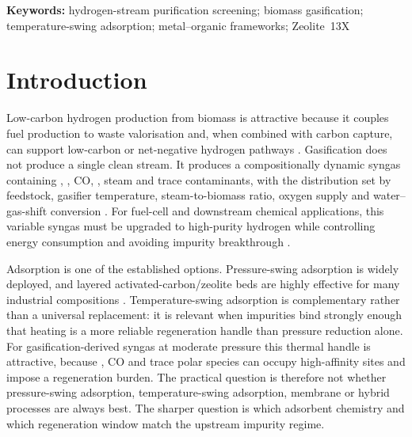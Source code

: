\documentclass[11pt,a4paper]{article}
\newcommand{\Htwo}{\ce{H2}}
\newcommand{\COtwo}{\ce{CO2}}
\newcommand{\CHfour}{\ce{CH4}}
\newcommand{\TSA}{temperature-swing adsorption}
\newcommand{\PSA}{pressure-swing adsorption}
\begin{document}
\noindent\textbf{Keywords:} hydrogen-stream purification screening; biomass gasification; temperature-swing adsorption; metal--organic frameworks; Zeolite~13X

\newpage

\section{Introduction}
\label{sec:intro}

Low-carbon hydrogen production from biomass is attractive because it couples fuel production to waste valorisation and, when combined with carbon capture, can support low-carbon or net-negative hydrogen pathways \citep{Rosa2022BiomassH2BECCS,Florin2008BiomassSorption}. Gasification does not produce a single clean stream. It produces a compositionally dynamic syngas containing \Htwo, \COtwo, CO, \CHfour, steam and trace contaminants, with the distribution set by feedstock, gasifier temperature, steam-to-biomass ratio, oxygen supply and water--gas-shift conversion \citep{Moghadam2017Syngas,Chojnacki2020WoodSteam,Shu2020Zhundong}. For fuel-cell and downstream chemical applications, this variable syngas must be upgraded to high-purity hydrogen while controlling energy consumption and avoiding impurity breakthrough \citep{Kim2025HydrogenPurity,Golmakani2020Impurities}.

Adsorption is one of the established options. Pressure-swing adsorption is widely deployed, and layered activated-carbon/zeolite beds are highly effective for many industrial compositions \citep{Tagliabue2008H2Purification,Yang1997GasSeparation,Delgado2014PSAH2,Yang2025Layered13X}. Temperature-swing adsorption is complementary rather than a universal replacement: it is relevant when impurities bind strongly enough that heating is a more reliable regeneration handle than pressure reduction alone. For gasification-derived syngas at moderate pressure this thermal handle is attractive, because \COtwo, CO and trace polar species can occupy high-affinity sites and impose a regeneration burden. The practical question is therefore not whether \PSA, \TSA, membrane or hybrid processes are always best. The sharper question is which adsorbent chemistry and which regeneration window match the upstream impurity regime.
\end{document}
